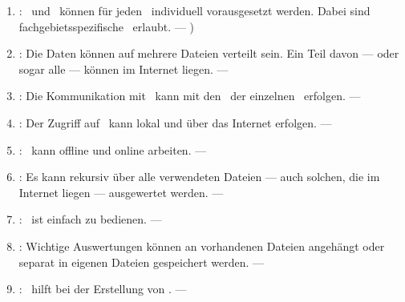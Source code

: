 \begin{enumerate}
	\item \label{Anforderung-Individualitaet} :
	\Axiome\ und \Saetze\ können für jeden \Beweis\ individuell vorausgesetzt werden.
	Dabei sind fachgebietsspezifische \Fachbegriffe\ erlaubt.
	--- )

	\item \label{Anforderung-Internet} :
	Die Daten können auf mehrere Dateien verteilt sein.
	Ein Teil davon --- oder sogar alle --- können im Internet liegen.
	--- 

	\item \label{Anforderung-Kommunikation} :
	Die Kommunikation mit \ASBA\ kann mit den \Fachbegriffen\ der einzelnen \Fachgebiete\ erfolgen.
	--- 

	\item \label{Anforderung-Zugriff} :
	Der Zugriff auf \ASBA\ kann lokal und über das Internet erfolgen.
	--- 

	\item \label{Anforderung-Unabhaengigkeit} :
	\ASBA\ kann offline und online arbeiten.
	--- 

	\item \label{Anforderung-Rekursion} :
	Es kann rekursiv über alle verwendeten Dateien --- auch solchen, die im Internet liegen --- ausgewertet werden.
	--- 

	\item \label{Anforderung-Bedienbarkeit} :
	\ASBA\ ist einfach zu bedienen.
	--- 

	\item \label{Anforderung-Zwischenspeicher} :
	Wichtige Auswertungen können an vorhandenen Dateien angehängt oder separat in eigenen Dateien gespeichert werden.
	--- 

	\item \label{Anforderung-Beweisunterstuetzung} :
	\ASBA\ hilft bei der Erstellung von \Beweisen.
	--- 

\end{enumerate}

\section[Axiome]{\Axiome}%
\beginsection   {\Axiome}
\label       {sec-Axiome}

